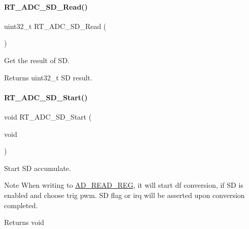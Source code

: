 \paragraph{\texorpdfstring{R\+T\+\_\+\+A\+D\+C\+\_\+\+S\+D\+\_\+\+Read()}{RT\_ADC\_SD\_Read()}}
{\footnotesize\ttfamily uint32\+\_\+t R\+T\+\_\+\+A\+D\+C\+\_\+\+S\+D\+\_\+\+Read (\begin{DoxyParamCaption}{ }\end{DoxyParamCaption})}



Get the result of SD. 

\begin{DoxyReturn}{Returns}
uint32\+\_\+t SD result. 
\end{DoxyReturn}
\mbox{\label{a00002_ac75cab97ce7cce47671dd8ef34e920d8}} 
\paragraph{\texorpdfstring{R\+T\+\_\+\+A\+D\+C\+\_\+\+S\+D\+\_\+\+Start()}{RT\_ADC\_SD\_Start()}}
{\footnotesize\ttfamily void R\+T\+\_\+\+A\+D\+C\+\_\+\+S\+D\+\_\+\+Start (\begin{DoxyParamCaption}\item[{void}]{ }\end{DoxyParamCaption})}



Start SD accumulate. 

\begin{DoxyNote}{Note}
When writing to \mbox{\hyperlink{a00020_af59f8074e13f7a5c80f07dc7c27c0610}{A\+D\+\_\+\+R\+E\+A\+D\+\_\+\+R\+EG}}, it will start df conversion, if SD is enabled and choose trig pwm. SD flag or irq will be asserted upon conversion completed. 
\end{DoxyNote}
\begin{DoxyReturn}{Returns}
void 
\end{DoxyReturn}
\mbox{\label{a00002_a99cb1f9dcaee38a9ce2bd5e9eca49f33}} 
